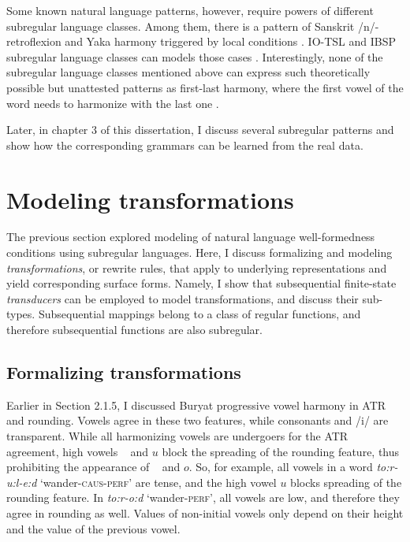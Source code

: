 Some known natural language patterns, however, require powers of different subregular language classes.
Among them, there is a pattern of Sanskrit /n/-retroflexion and Yaka harmony triggered by local conditions \citep{Walker2000,McMullin2016,Karakas2020}.
IO-TSL and IBSP subregular language classes can models those cases \citep{Graf17Phonology,Graf18NELS}.
Interestingly, none of the subregular language classes mentioned above can express such theoretically possible but unattested patterns as first-last harmony, where the first vowel of the word needs to harmonize with the last one \citep{Lai15,Avcu2017Experiment}.


Later, in chapter 3 of this dissertation, I discuss several subregular patterns and show how the corresponding grammars can be learned from the real data.










\section{Modeling transformations}

The previous section explored modeling of natural language well-formedness conditions using subregular languages.
Here, I discuss formalizing and modeling \emph{transformations}, or rewrite rules, that apply to underlying representations and yield corresponding surface forms.
Namely, I show that subsequential finite-state \emph{transducers} can be employed to model transformations, and discuss their sub-types.
Subsequential mappings belong to a class of regular functions, and therefore subsequential functions are also subregular.

\subsection{Formalizing transformations}
\label{FSTforburyat}

Earlier in Section 2.1.5, I discussed Buryat progressive vowel harmony in ATR and rounding.
Vowels agree in these two features, while consonants and /i/ are transparent.
While all harmonizing vowels are undergoers for the ATR agreement, high vowels \textupsilon~ and $u$ block the spreading of the rounding feature, thus prohibiting the appearance of \textopeno~ and $o$.
So, for example, all vowels in a word \emph{to:r-u:l-e:d} `wander-\textsc{caus-perf}' are tense, and the high vowel $u$ blocks spreading of the rounding feature.
In \emph{to:r-o:d} `wander-\textsc{perf}', all vowels are low, and therefore they agree in rounding as well.
Values of non-initial vowels only depend on their height and the value of the previous vowel.

